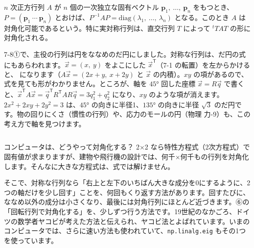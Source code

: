 {}

\begin{senmonsho}[大学の教科書ふうの書き方]
\begin{bkhonbun}
$n$ 次正方行列 $A$ が $n$ 個の一次独立な固有ベクトル $\symbf{p}_1,\ \dots,\ \symbf{p}_n$ をもつとき、$P=(\symbf{p}_1\ \cdots\ \symbf{p}_n)$ とおけば、$P^{-1}AP=\mathrm{diag}(\lambda_1,\ \dots,\ \lambda_n)$ となる。このとき $A$ は対角化可能であるという。特に実対称行列は、直交行列 $T$ によって ${}^tTAT$ の形に対角化される。
\end{bkhonbun}
\end{senmonsho}

\begin{motto}[5]
7-8①で、主役の行列は円をななめのだ円にしました。対称な行列は、だ円の式にもあらわれます。$\vec x=(x,\ y)$ をよこにした $\vec x^{\mathsf T}$（7-1 の転置）を左からかけると、
になります（$A\vec x=(2x+y,\ x+2y)$ と $\vec x$ の内積）。$xy$ の項があるので、式を見ても形がわかりません。ところが、軸を $45°$ 回した座標 $\vec x=R\vec q$ で書くと、$\vec x^{\mathsf T}A\vec x=\vec q^{\mathsf T}R^{\mathsf T}AR\vec q=3q_1^2+q_2^2$ になり、$xy$ のような項が消えます。$2x^2+2xy+2y^2=3$ は、$45°$ の向きに半径1、$135°$ の向きに半径 $\sqrt3$ のだ円です。物の回りにくさ（慣性の行列）や、応力のモールの円（物理 力-9）も、この考え方で軸を見つけます。
\end{motto}





\begin{column}{コンピュータは、どうやって対角化する？}
2×2 なら特性方程式（2次方程式）で固有値が求まりますが、建物や飛行機の設計では、何千×何千もの行列を対角化します。そんなに大きな方程式は、式では解けません。

そこで、対称な行列なら「右上と左下のいちばん大きな成分を0にするように、2つの軸だけを少し回す」ことを、何回もくり返す方法があります。回すたびに、ななめ以外の成分は小さくなり、最後には対角行列にほとんど近づきます。⑥の「回転行列で対角化する」を、少しずつ行う方法です。19世紀のなかごろ、ドイツの数学者ヤコビが考えた方法と伝えられ、ヤコビ法とよばれています。いまのコンピュータでは、さらに速い方法も使われていて、\texttt{np.linalg.eig} もその1つを使っています。
\end{column}

